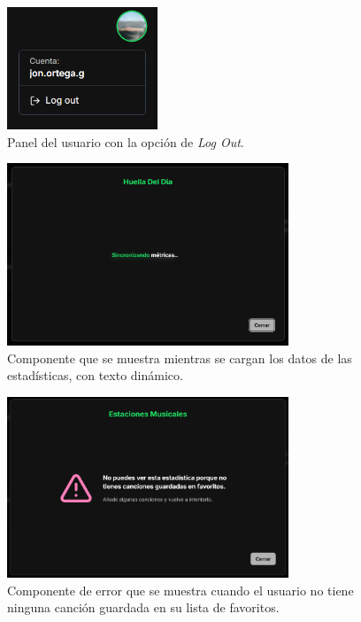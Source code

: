 \begin{figure}[H]
  \centering
  \vspace{-10pt}
  \includegraphics[width=0.4\textwidth]{figures/capturas_ui/user_action_panel.png}
  \caption{Panel del usuario con la opción de \textit{Log Out}.}
  \label{fig:user_action_panel}
\end{figure}

\begin{figure}[H]
  \centering
  \vspace{-10pt}
  \includegraphics[width=0.75\textwidth]{figures/capturas_ui/pantalla_carga.png}
  \caption{Componente que se muestra mientras se cargan los datos de las estadísticas, con texto dinámico.}
  \label{fig:pantalla_carga}
\end{figure}

\begin{figure}[H]
  \centering
  \vspace{-10pt}
  \includegraphics[width=0.75\textwidth]{figures/capturas_ui/error_no_favoritos.png}
  \caption{Componente de error que se muestra cuando el usuario no tiene ninguna canción guardada en su lista de favoritos.}
  \label{fig:error_no_favoritos}
\end{figure}

